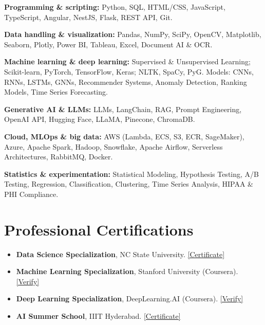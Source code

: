 \documentclass[11pt,a4paper]{article}
\newcommand{\cvItem}[1]{\item \small #1 \vspace{-1pt}}
\begin{document}
\textbf{Programming \& scripting:} Python, SQL, HTML/CSS, JavaScript, TypeScript, Angular, NestJS, Flask, REST API, Git.

\textbf{Data handling \& visualization:} Pandas, NumPy, SciPy, OpenCV, Matplotlib, Seaborn, Plotly, Power BI, Tableau, Excel, Document AI \& OCR.

\textbf{Machine learning \& deep learning:} Supervised \& Unsupervised Learning; Scikit-learn, PyTorch, TensorFlow, Keras; NLTK, SpaCy, PyG. Models: CNNs, RNNs, LSTMs, GNNs, Recommender Systems, Anomaly Detection, Ranking Models, Time Series Forecasting.

\textbf{Generative AI \& LLMs:} LLMs, LangChain, RAG, Prompt Engineering, OpenAI API, Hugging Face, LLaMA, Pinecone, ChromaDB.

\textbf{Cloud, MLOps \& big data:} AWS (Lambda, ECS, S3, ECR, SageMaker), Azure, Apache Spark, Hadoop, Snowflake, Apache Airflow, Serverless Architectures, RabbitMQ, Docker.

\textbf{Statistics \& experimentation:} Statistical Modeling, Hypothesis Testing, A/B Testing, Regression, Classification, Clustering, Time Series Analysis, HIPAA \& PHI Compliance.
\vspace{4pt}

\section{Professional Certifications}

\begin{itemize}[leftmargin=*,nosep]
  \cvItem{\textbf{Data Science Specialization}, NC State University. \href{https://drive.google.com/file/d/1-o0rSSCy6qN3lY99xNvIWSQEKPD0ELD7/view?usp=sharing}{[Certificate]}}
  \cvItem{\textbf{Machine Learning Specialization}, Stanford University (Coursera). \href{https://www.coursera.org/account/accomplishments/verify/9AB6K4JPZSQ9}{[Verify]}}
  \cvItem{\textbf{Deep Learning Specialization}, DeepLearning.AI (Coursera). \href{https://www.coursera.org/account/accomplishments/specialization/DFFQB96C6FJ2}{[Verify]}}
  \cvItem{\textbf{AI Summer School}, IIIT Hyderabad. \href{https://drive.google.com/file/d/1jPhjHO8WfoukW9IKUp8yKpRyoLKbnjFB/view}{[Certificate]}}
\end{itemize}
\vspace{4pt}
\end{document}
